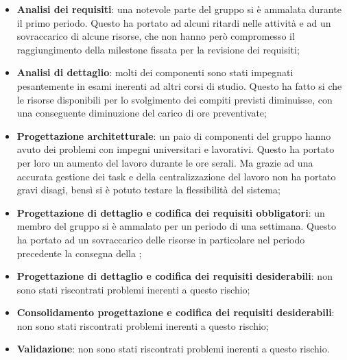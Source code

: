 			\begin{itemize}
				\item \textbf{Analisi dei requisiti}: una notevole parte del gruppo si è ammalata durante il primo periodo. Questo ha portato ad alcuni ritardi nelle attività e ad un sovraccarico di alcune risorse, che non hanno però compromesso il raggiungimento della milestone fissata per la revisione dei requisiti;
				\item \textbf{Analisi di dettaglio}: molti dei componenti sono stati impegnati pesantemente in esami inerenti ad altri corsi di studio. Questo ha fatto si che le risorse disponibili per lo svolgimento dei compiti previsti diminuisse, con una conseguente diminuzione del carico di ore preventivate;
				\item \textbf{Progettazione architetturale}: un paio di componenti del gruppo hanno avuto dei problemi con impegni universitari e lavorativi. Questo ha portato per loro un aumento del lavoro durante le ore serali. Ma grazie ad una accurata gestione dei task e della centralizzazione del lavoro non ha portato gravi disagi, bensì si è potuto testare la flessibilità del sistema;
				\item \textbf{Progettazione di dettaglio e codifica dei requisiti obbligatori}: un membro del gruppo si è ammalato per un periodo di una settimana. Questo ha portato ad un sovraccarico delle risorse in particolare nel periodo precedente la consegna della \RPmin;
				\item \textbf{Progettazione di dettaglio e codifica dei requisiti desiderabili}: non sono stati riscontrati problemi inerenti a questo rischio;
				\item \textbf{Consolidamento progettazione e codifica dei requisiti desiderabili}: non sono stati riscontrati problemi inerenti a questo rischio;
				\item \textbf{Validazione}: non sono stati riscontrati problemi inerenti a questo rischio.
			\end{itemize}

